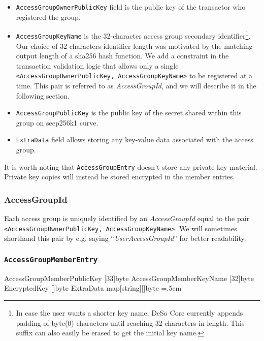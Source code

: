 \documentclass[oneside, 12pt]{article}
\newenvironment{lcverbatim}
 {\SaveVerbatim{cverb}}
 {\endSaveVerbatim
  \flushleft\fboxrule=0pt\fboxsep=.5em
  \colorbox{cverbbg}{%
    \makebox[\dimexpr\linewidth-2\fboxsep][l]{\BUseVerbatim{cverb}}%
  }
  \endflushleft
}
\newcommand{\ctexttt}[1]{\colorbox{cverbbg}{\texttt{#1}}}
\newcommand{\fn}[1]{\footnote{\hangpara{1.4em}{1} #1}}
\begin{document}
\begin{itemize}
  \item \texttt{AccessGroupOwnerPublicKey} field is the public key of the transactor who registered the group.

  \item \texttt{AccessGroupKeyName} is the 32-character access group secondary identifier\fn{In case the user wants a shorter key name, DeSo Core currently appends padding of byte(0) characters until reaching 32 characters in length. This suffix can also easily be erased to get the initial key name.}. Our choice of 32 characters identifier length was motivated by the matching output length of a sha256 hash function. We add a constraint in the transaction validation logic that allows only a single \texttt{<AccessGroupOwnerPublicKey, AccessGroupKeyName>} to be registered at a time. This pair is referred to as \textit{AccessGroupId}, and we will describe it in the following section.

  \item \texttt{AccessGroupPublicKey} is the public key of the secret shared within this group on secp256k1 curve.

  \item \texttt{ExtraData} field allows storing any key-value data associated with the access group.

\end{itemize}

It is worth noting that \texttt{AccessGroupEntry} doesn’t store any private key material. Private key copies will instead be stored encrypted in the member entries.

\subsubsection{AccessGroupId}
Each access group is uniquely identified by an \textit{AccessGroupId} equal to the pair \newline \ctexttt{<AccessGroupOwnerPublicKey, AccessGroupKeyName>}. We will sometimes shorthand this pair by e.g. saying “\textit{UserAccessGroupId}” for better readability.

\subsubsection{\texttt{AccessGroupMemberEntry}}
\begin{lcverbatim}
{
   AccessGroupMemberPublicKey [33]byte
   AccessGroupMemberKeyName   [32]byte
   EncryptedKey               []byte
   ExtraData                  map[string][]byte
}
\end{lcverbatim}
\end{document}
